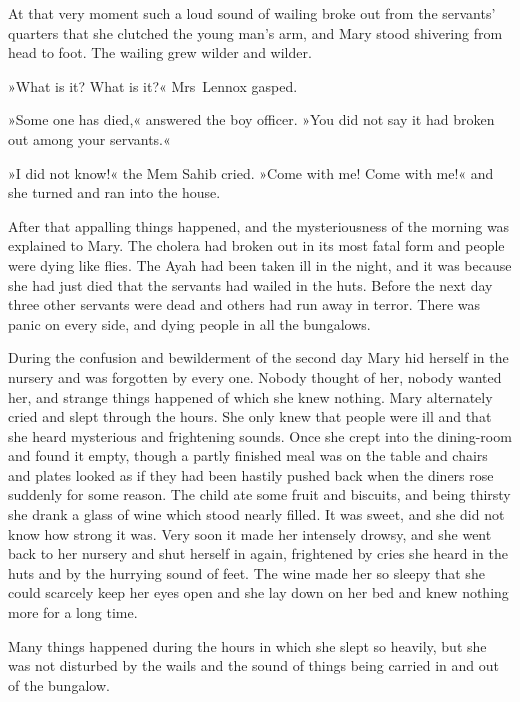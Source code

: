 At that very moment such a loud sound of wailing broke out from the servants' quarters that she clutched the young man's arm, and Mary stood shivering from head to foot. The wailing grew wilder and wilder.

»What is it? What is it?« Mrs~Lennox gasped.

»Some one has died,« answered the boy officer. »You did not say it had broken out among your servants.«

»I did not know!« the Mem Sahib cried. »Come with me! Come with me!« and she turned and ran into the house.

After that appalling things happened, and the mysteriousness of the morning was explained to Mary. The cholera had broken out in its most fatal form and people were dying like flies. The Ayah had been taken ill in the night, and it was because she had just died that the servants had wailed in the huts. Before the next day three other servants were dead and others had run away in terror. There was panic on every side, and dying people in all the bungalows.

During the confusion and bewilderment of the second day Mary hid herself in the nursery and was forgotten by every one. Nobody thought of her, nobody wanted her, and strange things happened of which she knew nothing. Mary alternately cried and slept through the hours. She only knew that people were ill and that she heard mysterious and frightening sounds. Once she crept into the dining-room and found it empty, though a partly finished meal was on the table and chairs and plates looked as if they had been hastily pushed back when the diners rose suddenly for some reason. The child ate some fruit and biscuits, and being thirsty she drank a glass of wine which stood nearly filled. It was sweet, and she did not know how strong it was. Very soon it made her intensely drowsy, and she went back to her nursery and shut herself in again, frightened by cries she heard in the huts and by the hurrying sound of feet. The wine made her so sleepy that she could scarcely keep her eyes open and she lay down on her bed and knew nothing more for a long time.

Many things happened during the hours in which she slept so heavily, but she was not disturbed by the wails and the sound of things being carried in and out of the bungalow.

